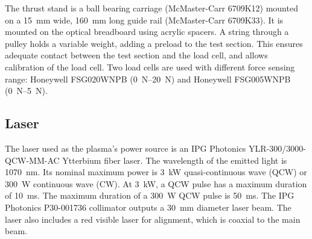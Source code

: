             The thrust stand is a ball bearing carriage (McMaster-Carr 6709K12) mounted on a \qty{15}{mm} wide, \qty{160}{mm} long guide rail (McMaster-Carr 6709K33). It is mounted on the optical breadboard using acrylic spacers. A string through a pulley holds a variable weight, adding a preload to the test section. This ensures adequate contact between the test section and the load cell, and allows calibration of the load cell. Two load cells are used with different force sensing range: Honeywell FSG020WNPB (\qtyrange{0}{20}{N}) and Honeywell FSG005WNPB (\qtyrange{0}{5}{N}).

        \subsection{Laser}

            The laser used as the plasma's power source is an IPG Photonics YLR-300/3000-QCW-MM-AC Ytterbium fiber laser. The wavelength of the emitted light is \qty{1070}{nm}. Its nominal maximum power is \qty{3}{kW} quasi-continuous wave (QCW) or \qty{300}{W} continuous wave (CW). At \qty{3}{kW}, a QCW pulse has a maximum duration of \qty{10}{ms}. The maximum duration of a \qty{300}{W} QCW pulse is \qty{50}{ms}. The IPG Photonics P30-001736 collimator outputs a \qty{30}{mm} diameter laser beam. The laser also includes a red visible laser for alignment, which is coaxial to the main beam.

